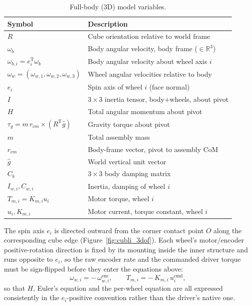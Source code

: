 \begin{table}[htbp]
\centering
\caption[Full-body (3D) model variables]{Full-body (3D) model variables.}
\label{tab:3d_vars}
\begin{tabular}{ll}
\toprule
Symbol & Description \\
\midrule
$R$ & Cube orientation relative to world frame \\
$\omega_b$ & Body angular velocity, body frame ($\in\mathbb{R}^3$) \\
$\omega_{b,i} = e_i^{\mathrm T}\omega_b$ & Body angular velocity about wheel axis $i$ \\
$\omega_w = (\omega_{w,1},\omega_{w,2},\omega_{w,3})$ & Wheel angular velocities relative to body \\
$e_i$ & Spin axis of wheel $i$ (face normal) \\
$I$ & $3\times3$ inertia tensor, body+wheels, about pivot \\
$H$ & Total angular momentum about pivot \\
$\tau_g = m\,r_{cm}\times(R^{\mathrm T}\hat g)$ & Gravity torque about pivot \\
$m$ & Total assembly mass \\
$r_{cm}$ & Body-frame vector, pivot to assembly CoM \\
$\hat g$ & World vertical unit vector \\
$C_b$ & $3\times3$ body damping matrix \\
$I_{w,i}, C_{w,i}$ & Inertia, damping of wheel $i$ \\
$T_{m,i} = K_{m,i}u_i$ & Motor torque, wheel $i$ \\
$u_i, K_{m,i}$ & Motor current, torque constant, wheel $i$ \\
\bottomrule
\end{tabular}
\end{table}

The spin axis $e_i$ is directed outward from the corner contact point $O$
along the corresponding cube edge (Figure~\ref{fig:cubli_3dof}). Each wheel's
motor/encoder positive-rotation direction is fixed by its mounting inside the
inner structure and runs opposite to $e_i$, so the raw encoder rate and the
commanded driver torque must be sign-flipped before they enter the equations
above:
\begin{equation}
\omega_{w,i} = -\,\omega_{w,i}^{\mathrm{enc}}, \qquad
T_{m,i} = -\,K_{m,i}\,u_i^{\mathrm{cmd}},
\label{eq:wheel_sign}
\end{equation}
so that $H$, Euler's equation and the per-wheel equation are all expressed
consistently in the $e_i$-positive convention rather than the driver's native
one.


